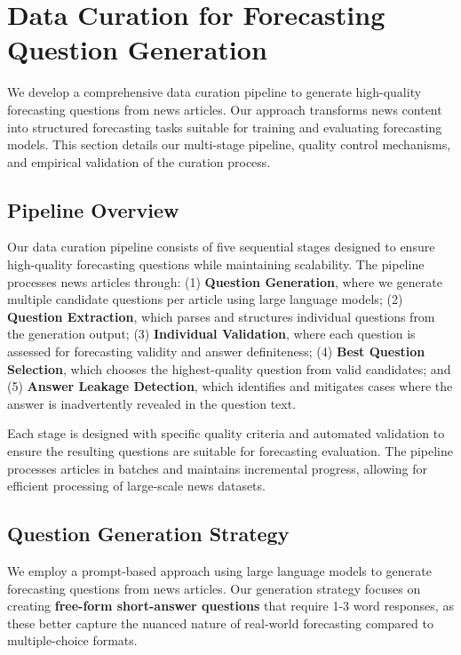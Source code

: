 \section{Data Curation for Forecasting Question Generation}
\label{sec:data_curation}

We develop a comprehensive data curation pipeline to generate high-quality forecasting questions from news articles. Our approach transforms news content into structured forecasting tasks suitable for training and evaluating forecasting models. This section details our multi-stage pipeline, quality control mechanisms, and empirical validation of the curation process.

\subsection{Pipeline Overview}
\label{subsec:pipeline_overview}

Our data curation pipeline consists of five sequential stages designed to ensure high-quality forecasting questions while maintaining scalability. The pipeline processes news articles through: (1) \textbf{Question Generation}, where we generate multiple candidate questions per article using large language models; (2) \textbf{Question Extraction}, which parses and structures individual questions from the generation output; (3) \textbf{Individual Validation}, where each question is assessed for forecasting validity and answer definiteness; (4) \textbf{Best Question Selection}, which chooses the highest-quality question from valid candidates; and (5) \textbf{Answer Leakage Detection}, which identifies and mitigates cases where the answer is inadvertently revealed in the question text.

Each stage is designed with specific quality criteria and automated validation to ensure the resulting questions are suitable for forecasting evaluation. The pipeline processes articles in batches and maintains incremental progress, allowing for efficient processing of large-scale news datasets.

\subsection{Question Generation Strategy}
\label{subsec:question_generation}

We employ a prompt-based approach using large language models to generate forecasting questions from news articles. Our generation strategy focuses on creating \textbf{free-form short-answer questions} that require 1-3 word responses, as these better capture the nuanced nature of real-world forecasting compared to multiple-choice formats.

